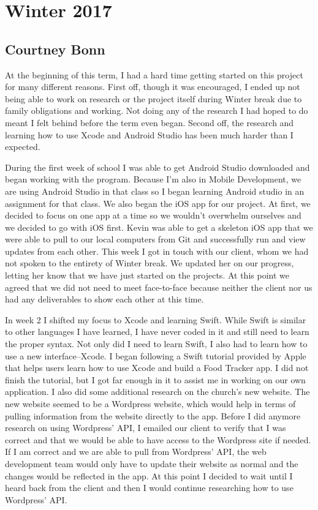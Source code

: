 \documentclass[letterpaper,10pt,draftclsnofoot,onecolumn,titlepage]{IEEEtran}
\begin{document}
	
\section{Winter 2017}

	\subsection{Courtney Bonn}
	At the beginning of this term, I had a hard time getting started on this project for many different reasons.
	First off, though it was encouraged, I ended up not being able to work on research or the project itself during Winter break due to family obligations and working. 
	Not doing any of the research I had hoped to do meant I felt behind before the term even began. 
	Second off, the research and learning how to use Xcode and Android Studio has been much harder than I expected. 
	
	During the first week of school I was able to get Android Studio downloaded and began working with the program. 
	Because I'm also in Mobile Development, we are using Android Studio in that class so I began learning Android studio in an assignment for that class. 
	We also began the iOS app for our project.
	At first, we decided to focus on one app at a time so we wouldn't overwhelm ourselves and we decided to go with iOS first. 
	Kevin was able to get a skeleton iOS app that we were able to pull to our local computers from Git and successfully run and view updates from each other. 
	This week I got in touch with our client, whom we had not spoken to the entirety of Winter break. 
	We updated her on our progress, letting her know that we have just started on the projects. 
	At this point we agreed that we did not need to meet face-to-face because neither the client nor us had any deliverables to show each other at this time. 
	
	In week 2 I shifted my focus to Xcode and learning Swift. 
	While Swift is similar to other languages I have learned, I have never coded in it and still need to learn the proper syntax. 
	Not only did I need to learn Swift, I also had to learn how to use a new interface--Xcode. 
	I began following a Swift tutorial provided by Apple that helps users learn how to use Xcode and build a Food Tracker app. 
	I did not finish the tutorial, but I got far enough in it to assist me in working on our own application.
	I also did some additional research on the church's new website. 
	The new website seemed to be a Wordpress website, which would help in terms of pulling information from the website directly to the app. 
	Before I did anymore research on using Wordpress' API, I emailed our client to verify that I was correct and that we would be able to have access to the Wordpress site if needed. 
	If I am correct and we are able to pull from Wordpress' API, the web development team would only have to update their website as normal and the changes would be reflected in the app. 
	At this point I decided to wait until I heard back from the client and then I would continue researching how to use Wordpress' API. 
	
\end{document}
